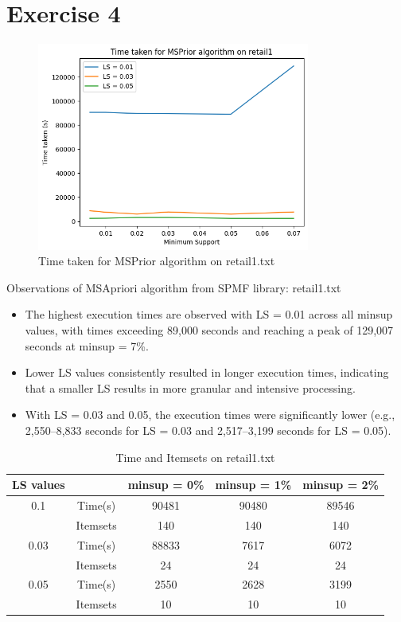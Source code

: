 \documentclass[12pt]{article}
\begin{document}
\section*{Exercise 4}
\begin{figure}[h] %
    \centering
    \includegraphics[width=0.8\textwidth]{4a.png}
    \caption{Time taken for MSPrior algorithm on retail1.txt}
\end{figure}

Observations of MSApriori algorithm from SPMF library: retail1.txt

\begin{itemize}
    \item The highest execution times are observed with LS = 0.01 across all minsup values, with times exceeding 89,000 seconds and reaching a peak of 129,007 seconds at minsup = 7\%.
    \item Lower LS values consistently resulted in longer execution times, indicating that a smaller LS results in more granular and intensive processing.
    \item With LS = 0.03 and 0.05, the execution times were significantly lower (e.g., 2,550–8,833 seconds for LS = 0.03 and 2,517–3,199 seconds for LS = 0.05).
\end{itemize}

\begin{table}[h] %
    \centering
    \begin{tabular}{ |c|c|c|c|c| }
        \hline
        \textbf{LS values} & &  \textbf{minsup = 0\%} & \textbf{minsup = 1\%} & \textbf{minsup = 2\%} \\
        \hline
        \hline
        0.1 & Time(s) & 90481 & 90480 & 89546  \\
        & Itemsets & 140 & 140 & 140 \\
        \hline
        0.03 & Time(s) & 88833 & 7617 & 6072 \\
        & Itemsets & 24 & 24 & 24 \\
        \hline
        0.05 & Time(s) & 2550 & 2628 & 3199 \\
        & Itemsets & 10 & 10 & 10 \\
        \hline
        \end{tabular}
    \caption{Time and Itemsets on retail1.txt}
\end{table}
\end{document}
